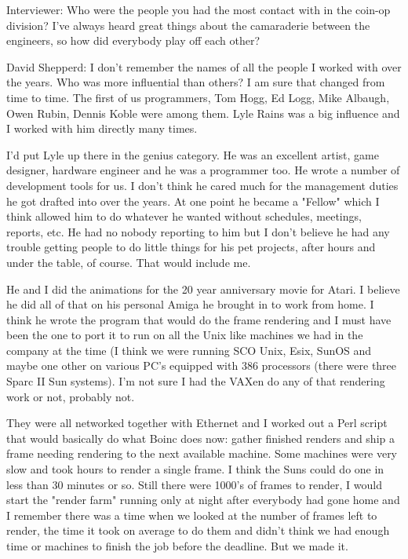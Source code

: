 \textcolor{interviewer}{Interviewer:} Who were the people you had the most contact with in the coin-op division? I've always heard great things about the camaraderie between the engineers, so how did everybody play off each other? 

\textcolor{interviewee}{David Shepperd:} I don't remember the names of all the people I worked with over the years. Who was more influential than others? I am sure that changed from time to time. The first of us programmers, Tom Hogg, Ed Logg, Mike Albaugh, Owen Rubin, Dennis Koble were among them. Lyle Rains was a big influence and I worked with him directly many times. 

I'd put Lyle up there in the genius category. He was an excellent artist, game designer, hardware engineer and he was a programmer too. He wrote a number of development tools for us. I don't think he cared much for the management duties he got drafted into over the years. At one point he became a "Fellow" which I think allowed him to do whatever he wanted without schedules, meetings, reports, etc. He had no nobody reporting to him but I don't believe he had any trouble getting people to do little things for his pet projects, after hours and under the table, of course. That would include me.

He and I did the animations for the 20 year anniversary movie for Atari. I believe he did all of that on his personal Amiga he brought in to work from home. I think he wrote the program that would do the frame rendering and I must have been the one to port it to run on all the Unix like machines we had in the company at the time (I think we were running SCO Unix, Esix, SunOS and maybe one other on various PC's equipped with 386 processors (there were three Sparc II Sun systems). I'm not sure I had the VAXen do any of that rendering work or not, probably not. 

They were all networked together with Ethernet and I worked out a Perl script that would basically do what Boinc does now: gather finished renders and ship a frame needing rendering to the next available machine. Some machines were very slow and took hours to render a single frame. I think the Suns could do one in less than 30 minutes or so. Still there were 1000's of frames to render, I would start the "render farm" running only at night after everybody had gone home and I remember there was a time when we looked at the number of frames left to render, the time it took on average to do them and didn't think we had enough time or machines to finish the job before the deadline. But we made it.


